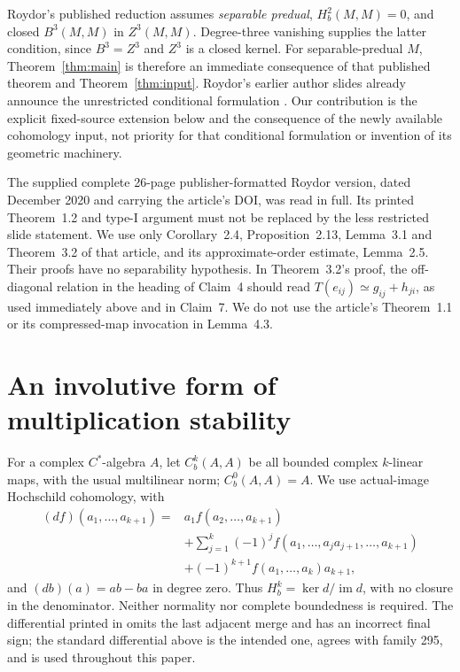\documentclass[11pt]{article}
\newcommand{\Cb}{C_b}
\newcommand{\Hb}{H_b}
\begin{document}
Roydor's published reduction \cite[Theorem 1.2]{Roydor2022} assumes
\emph{separable predual}, $\Hb^2(M,M)=0$, and closed $B^3(M,M)$ in
$Z^3(M,M)$. Degree-three vanishing supplies the latter condition, since
$B^3=Z^3$ and $Z^3$ is a closed kernel. For separable-predual $M$,
Theorem~\ref{thm:main} is therefore an immediate consequence of that
published theorem and Theorem~\ref{thm:input}. Roydor's earlier author
slides already announce the unrestricted conditional formulation
\cite[Theorem 2, PDF pp.~28--29]{RoydorSlides}. Our contribution is the
explicit fixed-source extension below and the consequence of the newly
available cohomology input, not priority for that conditional formulation
or invention of its geometric machinery.

The supplied complete 26-page publisher-formatted Roydor version, dated
December 2020 and carrying the article's DOI, was read in full. Its
printed Theorem~1.2 and type-I argument must not be replaced by the
less restricted slide statement. We use only Corollary~2.4,
Proposition~2.13, Lemma~3.1 and Theorem~3.2 of that article, and its
approximate-order estimate, Lemma~2.5. Their proofs have no separability
hypothesis. In Theorem~3.2's proof, the off-diagonal relation in the
heading of Claim~4 should read $T(e_{ij})\simeq g_{ij}+h_{ji}$, as used
immediately above and in Claim~7. We do not use the article's
Theorem~1.1 or its compressed-map invocation in Lemma~4.3.

\section{An involutive form of multiplication stability}
For a complex $C^*$-algebra $A$, let $\Cb^k(A,A)$ be all bounded complex
$k$-linear maps, with the usual multilinear norm; $\Cb^0(A,A)=A$.
We use actual-image Hochschild cohomology, with
\begin{align*}
 (df)(a_1,\ldots,a_{k+1})={}&a_1f(a_2,\ldots,a_{k+1})\\
 &+\sum_{j=1}^k(-1)^j f(a_1,\ldots,a_ja_{j+1},\ldots,a_{k+1})\\
 &+(-1)^{k+1}f(a_1,\ldots,a_k)a_{k+1},
\end{align*}
and $(db)(a)=ab-ba$ in degree zero. Thus
$\Hb^k=\ker d/\operatorname{im}d$, with no closure in the denominator.
Neither normality nor complete boundedness is required. The differential
printed in \cite[Sec.~4.2.1]{Roydor2022} omits the last adjacent merge and
has an incorrect final sign; the standard differential above is the
intended one, agrees with family 295, and is used throughout this paper.
\end{document}
